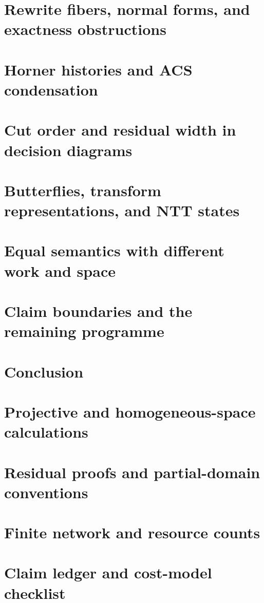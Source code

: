 \documentclass[11pt]{article}
\theoremstyle{definition}
\theoremstyle{remark}
\begin{document}
\section{Rewrite fibers, normal forms, and exactness obstructions}\label{sec:rewrite-fibers}

\section{Horner histories and ACS condensation}\label{sec:horner}

\section{Cut order and residual width in decision diagrams}\label{sec:obdd}

\section{Butterflies, transform representations, and NTT states}\label{sec:butterfly-ntt}

\section{Equal semantics with different work and space}\label{sec:time-space}

\section{Claim boundaries and the remaining programme}\label{sec:boundaries}

\section{Conclusion}\label{sec:conclusion}


\appendix
\section{Projective and homogeneous-space calculations}\label{app:projective}

\section{Residual proofs and partial-domain conventions}\label{app:residual}

\section{Finite network and resource counts}\label{app:network}

\section{Claim ledger and cost-model checklist}\label{app:ledger}




\end{document}
